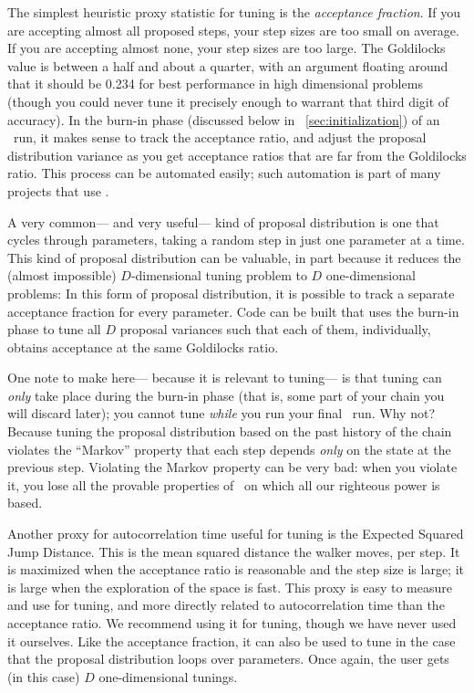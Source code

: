 \documentclass[modern]{aastex61}
\newcommand{\MCMC}{\acronym{MCMC}}
\begin{document}
The simplest heuristic proxy statistic for tuning is the \emph{acceptance fraction}.
If you are accepting almost all proposed steps, your step sizes are too small on average.
If you are accepting almost none, your step sizes are too large.
The Goldilocks value is between a half and about a quarter,
  with an argument floating around that it should be 0.234 for best
  performance in high dimensional problems
  (though you could never tune it precisely enough to warrant that third digit of accuracy).
In the burn-in phase (discussed below in \sectionname~\ref{sec:initialization}) of an \MCMC\ run,
  it makes sense to track the acceptance ratio,
  and adjust the proposal distribution variance as you get acceptance ratios
  that are far from the Goldilocks ratio.
This process can be automated easily;
  such automation is part of many projects that use \MCMC.

A very common---%
  and very useful---%
  kind of proposal distribution is one that cycles through parameters,
  taking a random step in just one parameter at a time.
This kind of proposal distribution can be valuable,
  in part because it reduces the (almost impossible) $D$-dimensional tuning problem
  to $D$ one-dimensional problems:
In this form of proposal distribution,
  it is possible to track a separate acceptance fraction for every parameter.
Code can be built that uses the burn-in phase to tune all $D$ proposal variances
  such that each of them, individually,
  obtains acceptance at the same Goldilocks ratio.

One note to make here---%
  because it is relevant to tuning---%
  is that tuning can \emph{only} take place during the burn-in phase
  (that is, some part of your chain you will discard later);
  you cannot tune \emph{while} you run your final \MCMC\ run.
Why not?
Because tuning the proposal distribution based on the past history of the chain
  violates the ``Markov'' property
  that each step depends \emph{only} on the state at the previous step.
Violating the Markov property can be very bad:
  when you violate it,
  you lose all the provable properties of \MCMC\
  on which all our righteous power is based.

Another proxy for autocorrelation time useful for tuning is the
  Expected Squared Jump Distance.
This is the mean squared distance the walker moves, per step.
It is maximized when the acceptance ratio is reasonable
  and the step size is large;
  it is large when the exploration of the space is fast.
This proxy is easy to measure and use for tuning,
  and more directly related to autocorrelation time than the acceptance ratio.
We recommend using it for tuning, though we have never used it ourselves.
Like the acceptance fraction, it can also be used to tune
  in the case that the proposal distribution loops over parameters.
Once again, the user gets (in this case) $D$ one-dimensional tunings.
\end{document}
